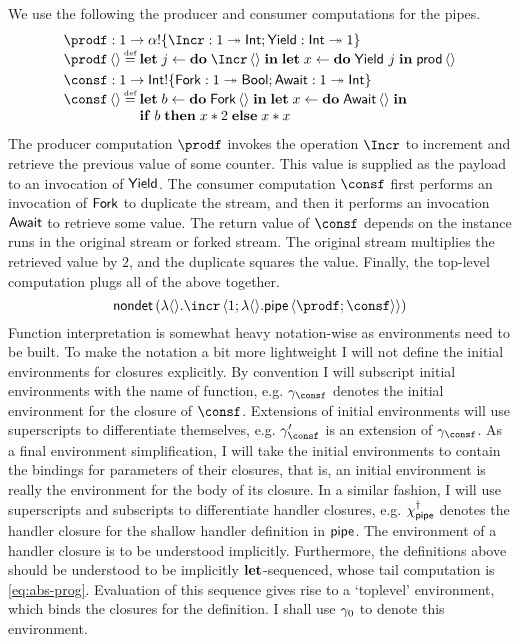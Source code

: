 \documentclass[12pt,phd,lfcs,twoside,openright,logo,leftchapter,normalheadings]{infthesis}
\theoremstyle{plain}
\theoremstyle{definition}
\begin{document}
%
We use the following the producer and consumer computations for the
pipes.
%
\[
  \bl
  \prodf : \UnitType \to \alpha \eff \{\Incr : \UnitType \opto \Int; \Yield : \Int \opto \UnitType\}\\
  \prodf\,\Unit \defas
  \bl
    \Let\;j \revto \Do\;\Incr\,\Unit\;\In\;
    \Let\;x \revto \Do\;\Yield~j\;
    \In\;\dec{prod}\,\Unit
  \el\smallskip\\
  \consf : \UnitType \to \Int \eff \{\Fork : \UnitType \opto \Bool; \Await : \UnitType \opto \Int\}\\
  \consf\,\Unit \defas
    \bl
      \Let\;b \revto \Do\;\Fork\,\Unit\;\In\;
      \Let\;x \revto \Do\;\Await\,\Unit\;\In\\
      \If\;b\;\Then\;x*2\;\Else\;x*x
    \el
  \el
\]
%
The producer computation $\prodf$ invokes the operation $\Incr$ to
increment and retrieve the previous value of some counter. This value
is supplied as the payload to an invocation of $\mathsf{Yield}$.
%
The consumer computation $\consf$ first performs an invocation of
$\mathsf{Fork}$ to duplicate the stream, and then it performs an invocation
$\mathsf{Await}$ to retrieve some value. The return value of $\consf$ depends
on the instance runs in the original stream or forked stream. The
original stream multiplies the retrieved value by $2$, and the
duplicate squares the value.
%
Finally, the top-level computation plugs all of the above together.
%
\begin{equation}
  \nondet\,(\lambda\Unit.\incr\,\Record{1;\lambda\Unit.\Pipe\,\Record{\prodf;\consf}})\label{eq:abs-prog}
\end{equation}
%
%
Function interpretation is somewhat heavy notation-wise as
environments need to be built. To make the notation a bit more
lightweight I will not define the initial environments for closures
explicitly. By convention I will subscript initial environments with
the name of function, e.g. $\env_\consf$ denotes the initial
environment for the closure of $\consf$. Extensions of initial
environments will use superscripts to differentiate themselves,
e.g. $\env_\consf'$ is an extension of $\env_\consf$. As a final
environment simplification, I will take the initial environments to
contain the bindings for parameters of their closures, that is, an
initial environment is really the environment for the body of its
closure. In a similar fashion, I will use superscripts and subscripts
to differentiate handler closures, e.g. $\chi^\dagger_{\mathsf{pipe}}$ denotes
the handler closure for the shallow handler definition in $\mathsf{pipe}$. The
environment of a handler closure is to be understood
implicitly. Furthermore, the definitions above should be understood to
be implicitly $\mathbf{let}$-sequenced, whose tail computation is
\eqref{eq:abs-prog}. Evaluation of this sequence gives rise to a
`toplevel' environment, which binds the closures for the definition. I
shall use $\gamma_0$ to denote this environment.
\end{document}
